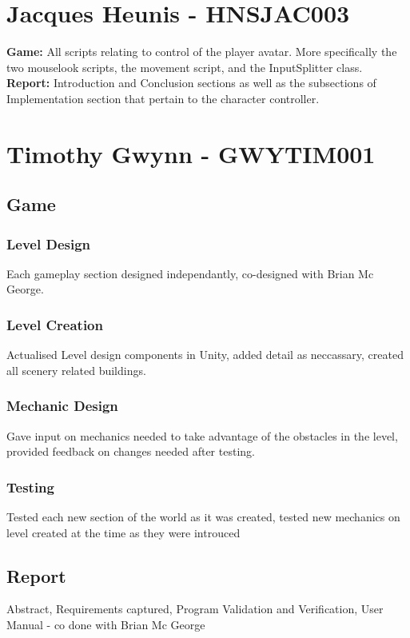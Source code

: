 \documentclass[11pt,a4paper]{article}
\begin{document}
\section{Jacques Heunis - HNSJAC003}
\textbf{Game:} All scripts relating to control of the player avatar. More specifically the two mouselook scripts, the movement script, and the InputSplitter class. \\
\textbf{Report:} Introduction and Conclusion sections as well as the subsections of Implementation section that pertain to the character controller.
\section{Timothy Gwynn - GWYTIM001}
\subsection{Game}
\subsubsection{Level Design}
Each gameplay section designed independantly, co-designed with Brian Mc George.
\subsubsection{Level Creation}
Actualised Level design components in Unity, added detail as neccassary, created all scenery related buildings.
\subsubsection{Mechanic Design}
Gave input on mechanics needed to take advantage of the obstacles in the level, provided feedback on changes needed after testing.
\subsubsection{Testing}
Tested each new section of the world as it was created, tested new mechanics on level created at the time as they were introuced
\subsection{Report}
Abstract, Requirements captured, Program Validation and Verification, User Manual - co done with Brian Mc George
\end{document}
